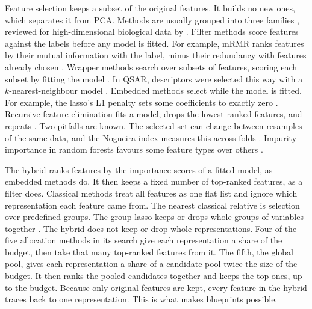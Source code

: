 Feature selection keeps a subset of the original features. It builds no new ones, which separates it from PCA. Methods are usually grouped into three families \citep{Guyon2003}, reviewed for high-dimensional biological data by \citet{Saeys2007}. Filter methods score features against the labels before any model is fitted. For example, mRMR ranks features by their mutual information with the label, minus their redundancy with features already chosen \citep{Peng2005}. Wrapper methods search over subsets of features, scoring each subset by fitting the model \citep{Kohavi1997}. In QSAR, descriptors were selected this way with a $k$-nearest-neighbour model \citep{Zheng2000}. Embedded methods select while the model is fitted. For example, the lasso's L1 penalty sets some coefficients to exactly zero \citep{Tibshirani1996}. Recursive feature elimination fits a model, drops the lowest-ranked features, and repeats \citep{Guyon2002}. Two pitfalls are known. The selected set can change between resamples of the same data, and the Nogueira index measures this across folds \citep{Nogueira2018}. Impurity importance in random forests favours some feature types over others \citep{Strobl2007}.

The hybrid ranks features by the importance scores of a fitted model, as embedded methods do. It then keeps a fixed number of top-ranked features, as a filter does. Classical methods treat all features as one flat list and ignore which representation each feature came from. The nearest classical relative is selection over predefined groups. The group lasso keeps or drops whole groups of variables together \citep{Yuan2006}. The hybrid does not keep or drop whole representations. Four of the five allocation methods in its search give each representation a share of the budget, then take that many top-ranked features from it. The fifth, the global pool, gives each representation a share of a candidate pool twice the size of the budget. It then ranks the pooled candidates together and keeps the top ones, up to the budget. Because only original features are kept, every feature in the hybrid traces back to one representation. This is what makes blueprints possible.

